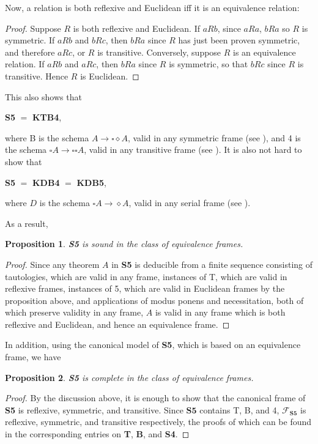 \documentclass[12pt]{article}
\newtheorem{prop}{Proposition}
\begin{document}
Now, a relation is both reflexive and Euclidean iff it is an equivalence relation:
\begin{proof}
Suppose $R$ is both reflexive and Euclidean.  If $a R b$, since $a R a$, $b R a$ so $R$ is symmetric.  If $a R b$ and $b R c$, then $b R a$ since $R$ has just been proven symmetric, and therefore $a R c$, or $R$ is transitive.  Conversely, suppose $R$ is an equivalence relation.  If $a R b$ and $a R c$, then $b R a$ since $R$ is symmetric, so that $b R c$ since $R$ is transitive.  Hence $R$ is Euclidean.  
\end{proof}
This also shows that 
\begin{center}
\textbf{S5} $=$ \textbf{KTB4},
\end{center} 
where B is the schema $A\to \square \diamond A$, valid in any symmetric frame (see ), and 4 is the schema $\square A \to \square \square A$, valid in any transitive frame (see ).  It is also not hard to show that 
\begin{center}
\textbf{S5} $=$ \textbf{KDB4} $=$ \textbf{KDB5}, 
\end{center} 
where $D$ is the schema $\square A \to \diamond A$, valid in any serial frame (see ).

As a result,
\begin{prop} \textbf{S5} is sound in the class of equivalence frames. \end{prop}
\begin{proof}  Since any theorem $A$ in \textbf{S5} is deducible from a finite sequence consisting of tautologies, which are valid in any frame, instances of T, which are valid in reflexive frames, instances of 5, which are valid in Euclidean frames by the proposition above, and applications of modus ponens and necessitation, both of which preserve validity in any frame, $A$ is valid in any frame which is both reflexive and Euclidean, and hence an equivalence frame.
\end{proof}

In addition, using the canonical model of \textbf{S5}, which is based on an equivalence frame, we have
\begin{prop} \textbf{S5} is complete in the class of equivalence frames. \end{prop}
\begin{proof}  By the discussion above, it is enough to show that the canonical frame of \textbf{S5} is reflexive, symmetric, and transitive.  Since $\textbf{S5}$ contains T, B, and 4, $\mathcal{F}_{\textbf{S5}}$ is reflexive, symmetric, and transitive respectively, the proofs of which can be found in the corresponding entries on \textbf{T}, \textbf{B}, and \textbf{S4}.
\end{proof}
\end{document}
